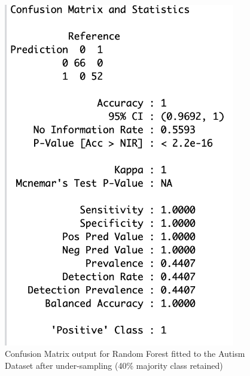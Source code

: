 \begin{figure}[!htbp]
    \centering
    \begin{minipage}{0.45\textwidth}
        \centering
        \includegraphics[width=0.9\textwidth]{ThesisTemplate/appendix/images/Chapter5Appendix/ConfusionMatrix40/Autism.png}
        \caption{Confusion Matrix output for Random Forest fitted to the Autism Dataset after under-sampling (40\% majority class retained)}
        \label{fig:my_label}
    \end{minipage}\hfill
    \begin{minipage}{0.45\textwidth}
        \centering

\end{minipage}
\end{figure}
